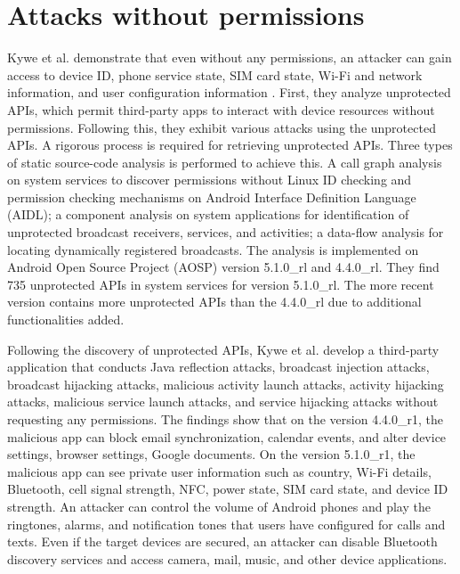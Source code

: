\documentclass[
  a4paper,  %
  twoside,  %
  bibliography=totoc,
  headsepline,
  cleardoublepage=empty,
  parskip=half,
  draft=false,
  open=any
]{scrbook}
\begin{document}
\section{Attacks without permissions}
Kywe et al. demonstrate that even without any permissions, an attacker can gain access to device ID, phone service state, SIM card state, Wi-Fi and network information, and user configuration information \cite{kywe2016}. First, they analyze unprotected APIs, which permit third-party apps to interact with device resources without permissions. Following this, they exhibit various attacks using the unprotected APIs. A rigorous process is required for retrieving unprotected APIs. Three types of static source-code analysis is performed to achieve this. A call graph analysis on system services to discover permissions without Linux ID checking and permission checking mechanisms on Android Interface Definition Language (AIDL); a component analysis on system applications for identification of unprotected broadcast receivers, services, and activities; a data-flow analysis for locating dynamically registered broadcasts. The analysis is implemented on Android Open Source Project (AOSP) version 5.1.0\_rl and 4.4.0\_rl. They find 735 unprotected APIs in system services for version 5.1.0\_rl. The more recent version contains more unprotected APIs than the 4.4.0\_rl due to additional functionalities added.

Following the discovery of unprotected APIs, Kywe et al. develop a third-party application that conducts Java reflection attacks, broadcast injection attacks, broadcast hijacking attacks, malicious activity launch attacks, activity hijacking attacks, malicious service launch attacks, and service hijacking attacks without requesting any permissions. The findings show that on the version 4.4.0\_r1, the malicious app can block email synchronization, calendar events, and alter device settings, browser settings, Google documents. On the version 5.1.0\_r1, the malicious app can see private user information such as country, Wi-Fi details, Bluetooth, cell signal strength, NFC, power state, SIM card state, and device ID strength. An attacker can control the volume of Android phones and play the ringtones, alarms, and notification tones that users have configured for calls and texts. Even if the target devices are secured, an attacker can disable Bluetooth discovery services and access camera, mail, music, and other device applications.
\end{document}
